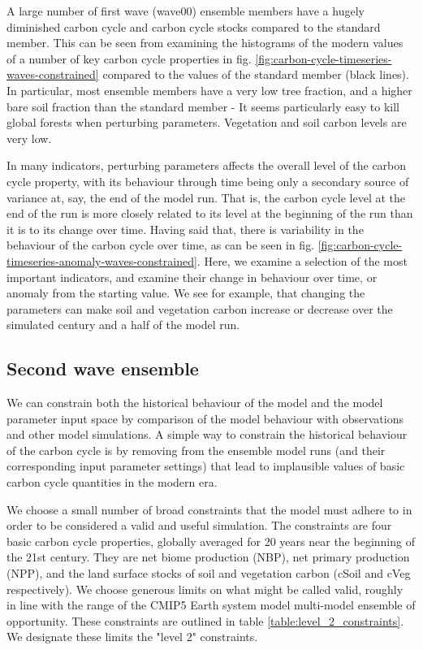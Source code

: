 \documentclass[gmd, manuscript]{copernicus}
\begin{document}
A large number of first wave (wave00) ensemble members have a hugely diminished carbon cycle and carbon cycle stocks compared to the standard member. This can be seen from examining the histograms of the modern values of a number of key carbon cycle properties in fig. \ref{fig:carbon-cycle-timeseries-waves-constrained} compared to the values of the standard member (black lines). In particular, most ensemble members have a very low tree fraction, and a higher bare soil fraction than the standard member - It seems particularly easy to kill global forests when perturbing parameters. Vegetation and soil carbon levels are very low. 

In many indicators, perturbing parameters affects the overall level of the carbon cycle property, with its behaviour through time being only a secondary source of variance at, say, the end of the model run. That is, the carbon cycle level at the end of the run is more closely related to its level at the beginning of the run than it is to its change over time. Having said that, there is variability in the behaviour of the carbon cycle over time, as can be seen in fig. \ref{fig:carbon-cycle-timeseries-anomaly-waves-constrained}. Here, we examine a selection of the most important indicators, and examine their change in behaviour over time, or anomaly from the starting value. We see for example, that changing the parameters can make soil and vegetation carbon increase or decrease over the simulated century and a half of the model run. 

\subsection{Second wave ensemble}\label{ssec:second_wave}

We can constrain both the historical behaviour of the model and the model parameter input space by comparison of the model behaviour with observations and other model simulations. A simple way to constrain the historical behaviour of the carbon cycle is by removing from the ensemble model runs (and their corresponding input parameter settings) that lead to implausible values of basic carbon cycle quantities in the modern era.

We choose a small number of broad constraints that the model must adhere to in order to be considered a valid and useful simulation. The constraints are four basic carbon cycle properties, globally averaged for 20 years near the beginning of the 21st century. They are net biome production (NBP), net primary production (NPP), and the land surface stocks of soil and vegetation carbon (cSoil and cVeg respectively). We choose generous limits on what might be called valid, roughly in line with the range of the CMIP5 Earth system model multi-model ensemble of opportunity. These constraints are outlined in table \ref{table:level_2_constraints}. We designate these limits the "level 2" constraints.
\end{document}
